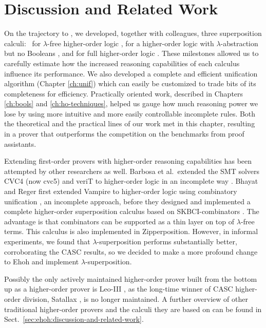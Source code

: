   \section{Discussion and Related Work} %
  \label{sec:ehoh2:discussion}
  
  On the trajectory to \ehohii{}, we developed, together with colleagues, three
  superposition calculi:\ \lfsup{} for $\lambda$-free higher-order logic
  \cite{bbcw-21-lfho}, \lsup{} for a higher-order logic with
  $\lambda$-abstra\-ction but no Booleans \cite{bbtvw-21-sup-lam}, and \osup{}
  for full higher-order logic \cite{bbtv-21-full-ho-sup}. These milestones allowed
  us to carefully estimate how the increased reasoning capabilities of each
  calculus influence its performance. We also developed a complete and efficient
  unification algorithm (Chapter \ref{ch:unif}) which can easily be customized
  to trade bits of its completeness for efficiency. Practically oriented work,
  described in Chapters \ref{ch:bools} and \ref{ch:ho-techniques},
  helped us gauge how much reasoning power we lose by using more intuitive and
  more easily controllable incomplete rules. Both the theoretical and the
  practical lines of our work met in this chapter, resulting in a prover that
  outperforms the competition on the benchmarks from proof assistants.
  
  Extending first-order provers with higher-order reasoning capabilities has been
  attempted by other researchers as well.
  Barbosa et al.\ extended
  the SMT solvers CVC4 (now cvc5) and veriT to higher-order logic in an incomplete
  way \cite{brotb-19-ho-smt}.
  Bhayat and Reger first extended Vampire to
  higher-order logic using combinatory unification \cite{br-19-restricted-unif},
  an incomplete approach, before they designed and implemented a complete
  higher-order superposition calculus based on \textsf{SKBCI}-com\-binators \cite{br-20-full-sup-w-combs}.
  The advantage is that combinators can be supported as a thin layer on top of
  $\lambda$-free terms.
  This calculus is also implemented in Zipperposition.
  However, in informal experiments, we found that $\lambda$-superposition
  performs substantially better, corroborating the CASC results, so we decided to
  make a more profound change to Ehoh and implement $\lambda$-superposition.
  \pagebreak[2]

  Possibly the only actively maintained higher-order prover built from the
  bottom up as a higher-order prover is Leo-III \cite{sb-21-leo3}, as the
  long-time winner of CASC higher-order division, Satallax
  \cite{cb-12-satallax}, is no longer maintained. A further overview of other
  traditional higher-order provers and the calculi they are based on can be
  found in Sect.~\ref{sec:ehoh:discussion-and-related-work}.
  
